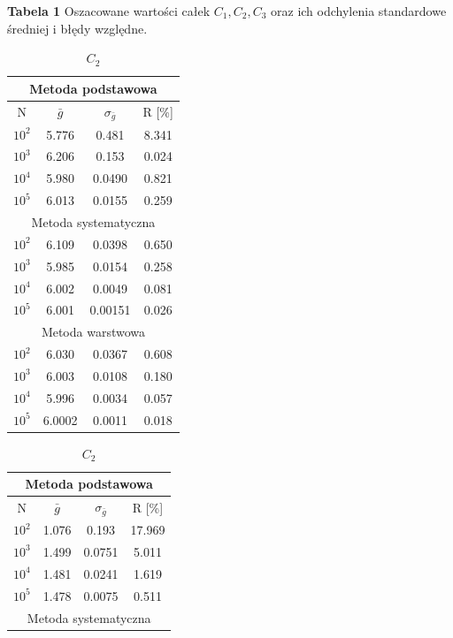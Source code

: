 \documentclass[a4paper,12pt,twoside]{article}
\begin{document}
\textbf{Tabela 1} Oszacowane wartości całek $C_1, C_2, C_3$ oraz ich odchylenia standardowe średniej i błędy względne.
\begin{table}[h!]
\centering
\begin{minipage}[t]{0.32\textwidth}
\centering
\caption*{$C_1$}
\hspace{-6mm}
\begin{tabular}{|c|c|c|c|}
\hline
\multicolumn{4}{|c|}{Metoda podstawowa} \\ \hline
N & $\bar{g}$ & $\sigma_{\bar{g}}$ & R [\%] \\ \hline
$10^2$ & 5.776 & 0.481 & 8.341 \\ \hline
$10^3$ & 6.206 & 0.153 & 0.024 \\ \hline
$10^4$ & 5.980 & 0.0490 & 0.821 \\ \hline
$10^5$ & 6.013 & 0.0155 & 0.259 \\ \hline
\multicolumn{4}{|c|}{Metoda systematyczna} \\ \hline
$10^2$ & 6.109 & 0.0398 & 0.650 \\ \hline
$10^3$ & 5.985 & 0.0154 & 0.258 \\ \hline
$10^4$ & 6.002 & 0.0049 & 0.081 \\ \hline
$10^5$ & 6.001 & 0.00151 & 0.026 \\ \hline
\multicolumn{4}{|c|}{Metoda warstwowa} \\ \hline
$10^2$ & 6.030 & 0.0367 & 0.608 \\ \hline
$10^3$ & 6.003 & 0.0108 & 0.180 \\ \hline
$10^4$ & 5.996 & 0.0034 & 0.057 \\ \hline
$10^5$ & 6.0002 & 0.0011 & 0.018 \\ \hline
\end{tabular}
\end{minipage}
\hfill
\begin{minipage}[t]{0.32\textwidth}
\centering
\caption*{$C_2$}
\begin{tabular}{|c|c|c|c|}
\hline
\multicolumn{4}{|c|}{Metoda podstawowa} \\ \hline
N & $\bar{g}$ & $\sigma_{\bar{g}}$ & R [\%] \\ \hline
$10^2$ & 1.076 & 0.193 & 17.969 \\ \hline
$10^3$ & 1.499 & 0.0751 & 5.011 \\ \hline
$10^4$ & 1.481 & 0.0241 & 1.619 \\ \hline
$10^5$ & 1.478 & 0.0075 & 0.511 \\ \hline
\multicolumn{4}{|c|}{Metoda systematyczna} \\ \hline

\end{tabular}
\end{minipage}
\end{table}
\end{document}
